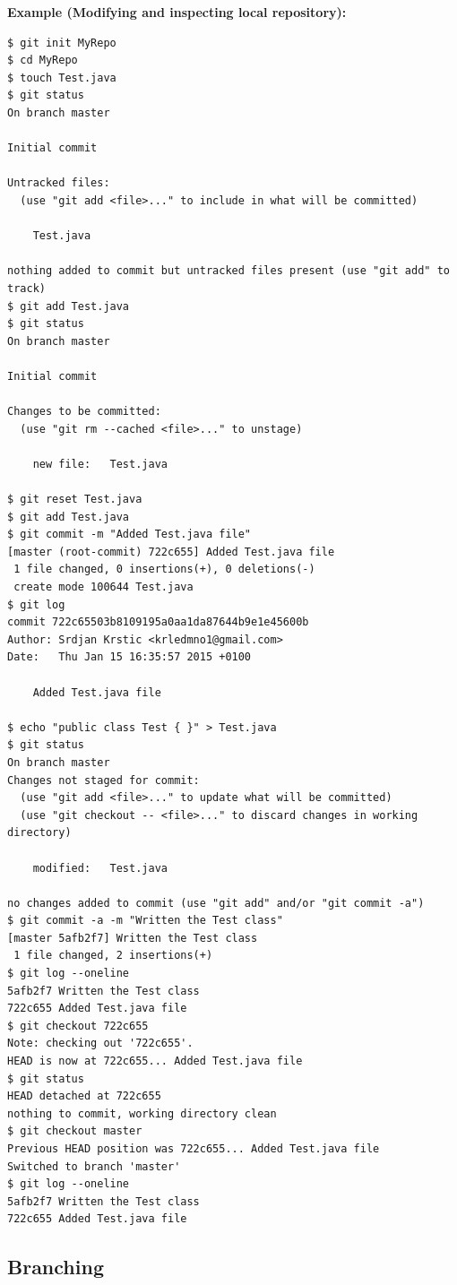 \documentclass{article}
\begin{document}
\textbf{Example (Modifying and inspecting local repository):}
\begin{lstlisting}
$ git init MyRepo
$ cd MyRepo
$ touch Test.java
$ git status
On branch master

Initial commit

Untracked files:
  (use "git add <file>..." to include in what will be committed)

	Test.java

nothing added to commit but untracked files present (use "git add" to
track)
$ git add Test.java 
$ git status
On branch master

Initial commit

Changes to be committed:
  (use "git rm --cached <file>..." to unstage)

	new file:   Test.java

$ git reset Test.java
$ git add Test.java
$ git commit -m "Added Test.java file"
[master (root-commit) 722c655] Added Test.java file
 1 file changed, 0 insertions(+), 0 deletions(-)
 create mode 100644 Test.java
$ git log
commit 722c65503b8109195a0aa1da87644b9e1e45600b
Author: Srdjan Krstic <krledmno1@gmail.com>
Date:   Thu Jan 15 16:35:57 2015 +0100

    Added Test.java file

$ echo "public class Test { }" > Test.java
$ git status
On branch master
Changes not staged for commit:
  (use "git add <file>..." to update what will be committed)
  (use "git checkout -- <file>..." to discard changes in working directory)

	modified:   Test.java

no changes added to commit (use "git add" and/or "git commit -a")
$ git commit -a -m "Written the Test class"
[master 5afb2f7] Written the Test class
 1 file changed, 2 insertions(+)
$ git log --oneline
5afb2f7 Written the Test class
722c655 Added Test.java file
$ git checkout 722c655
Note: checking out '722c655'.
HEAD is now at 722c655... Added Test.java file
$ git status
HEAD detached at 722c655
nothing to commit, working directory clean
$ git checkout master
Previous HEAD position was 722c655... Added Test.java file
Switched to branch 'master'
$ git log --oneline
5afb2f7 Written the Test class
722c655 Added Test.java file
\end{lstlisting}

\subsection{Branching}
\end{document}
